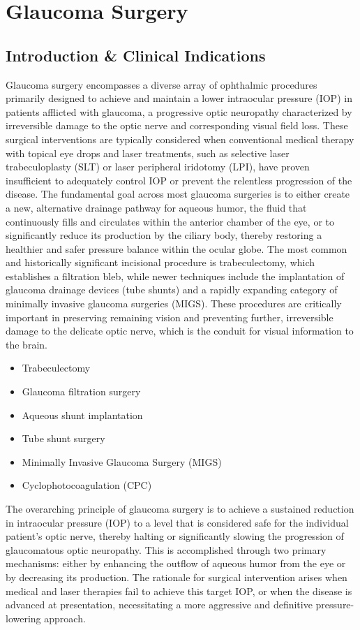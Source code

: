 \chapter{Glaucoma Surgery}

\section*{Introduction \& Clinical Indications}
Glaucoma surgery encompasses a diverse array of ophthalmic procedures primarily designed to achieve and maintain a lower intraocular pressure (IOP) in patients afflicted with glaucoma, a progressive optic neuropathy characterized by irreversible damage to the optic nerve and corresponding visual field loss. These surgical interventions are typically considered when conventional medical therapy with topical eye drops and laser treatments, such as selective laser trabeculoplasty (SLT) or laser peripheral iridotomy (LPI), have proven insufficient to adequately control IOP or prevent the relentless progression of the disease. The fundamental goal across most glaucoma surgeries is to either create a new, alternative drainage pathway for aqueous humor, the fluid that continuously fills and circulates within the anterior chamber of the eye, or to significantly reduce its production by the ciliary body, thereby restoring a healthier and safer pressure balance within the ocular globe. The most common and historically significant incisional procedure is trabeculectomy, which establishes a filtration bleb, while newer techniques include the implantation of glaucoma drainage devices (tube shunts) and a rapidly expanding category of minimally invasive glaucoma surgeries (MIGS). These procedures are critically important in preserving remaining vision and preventing further, irreversible damage to the delicate optic nerve, which is the conduit for visual information to the brain.

\begin{itemize}
  \item Trabeculectomy
  \item Glaucoma filtration surgery
  \item Aqueous shunt implantation
  \item Tube shunt surgery
  \item Minimally Invasive Glaucoma Surgery (MIGS)
  \item Cyclophotocoagulation (CPC)
\end{itemize}

The overarching principle of glaucoma surgery is to achieve a sustained reduction in intraocular pressure (IOP) to a level that is considered safe for the individual patient's optic nerve, thereby halting or significantly slowing the progression of glaucomatous optic neuropathy. This is accomplished through two primary mechanisms: either by enhancing the outflow of aqueous humor from the eye or by decreasing its production. The rationale for surgical intervention arises when medical and laser therapies fail to achieve this target IOP, or when the disease is advanced at presentation, necessitating a more aggressive and definitive pressure-lowering approach.

